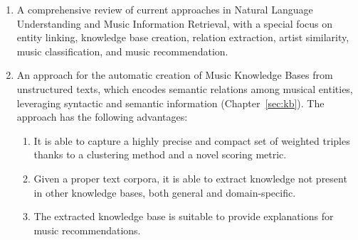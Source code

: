 \begin{enumerate}

\item 
A comprehensive review of current approaches in Natural Language Understanding and Music Information Retrieval, with a special focus on entity linking, knowledge base creation, relation extraction, artist similarity, music classification, and music recommendation.


\item 
An approach for the automatic creation of Music Knowledge Bases from unstructured texts, which encodes semantic relations among musical entities, leveraging syntactic and semantic information (Chapter~\ref{sec:kb}). %
The approach has the following advantages:

\begin{enumerate}
\item 
It is able to capture a highly precise and compact set of weighted triples thanks to a clustering method and a novel scoring metric. 
\item 
Given a proper text corpora, it is able to extract knowledge not present in other knowledge bases, both general and domain-specific. 
\item
The extracted knowledge base is suitable to provide explanations for music recommendations.
\end{enumerate}


\end{enumerate}
